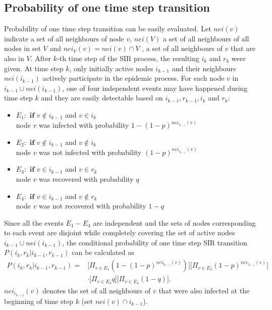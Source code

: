 \documentclass[times, utf8, diplomski]{fer}
\newcommand\tab[1][1cm]{\hspace*{#1}}
\begin{document}
\subsection{Probability of one time step transition}
Probability of one time step transition can be easily evaluated. Let $nei(v)$ indicate a set of all neighbours of node $v$,  $nei(V)$ a set of all neighbours of all nodes in set $V$ and  $nei_V(v) = nei(v) \cap V$ ,  a set of all neighbours of $v$ that are also in $V$. After $k$-th time step of the SIR process, the resulting $i_k$ and $r_k$ were given. At time step $k$, only initially active nodes $i_{k - 1}$ and their neighbours $nei(i_{k - 1})$ actively participate in the epidemic process. For each node $v$ in $i_{k - 1} \cup nei(i_{k - 1})$, one of four independent events may have happened during time step $k$ and they are easily detectable based on $i_{k - 1}, r_{k - 1}, i_{k}$ and $r_{k}$:
\let\labelitemi\labelitemii
\begin{itemize}
\item{$E_1:$ $\mathbf{if}$ $v \not\in i_{k - 1}$ and $v \in i_{k}$\\ \tab node $v$ was infected with probability $1 - (1 - p) ^ {nei_{i_{k-1}}(v)}$}
\item{$E_2:$ $\mathbf{if}$ $v \not\in i_{k - 1}$ and $v \not \in i_{k}$\\ \tab node $v$ was not infected with probability $(1 - p)^{nei_{i_{k-1}}(v)}$}
\item{$E_3:$ $\mathbf{if}$ $v \in i_{k - 1}$ and $v \in r_{k}$\\ \tab  node $v$ was recovered with probability $q$}
\item{$E_4:$ $\mathbf{if}$ $v \in i_{k - 1}$ and $v \not\in r_{k}$ \\ \tab node $v$ was not recovered with probability $1 - q$}
\end{itemize}

Since all the events $E_1 - E_4$ are independent and the sets of nodes corresponding to each event are disjoint while completely covering the set of active nodes $i_{k - 1} \cup nei(i_{k - 1})$, the  conditional probability of  one time step SIR transition $P(i_k, r_k | i_{k - 1}, r_{k - 1})$ can be calculated as
\begin{equation}
\begin{split}
P(i_k, r_k | i_{k - 1}, r_{k - 1}) =  &\big[\Pi_{v \in E_1} (1 - (1 - p) ^ {nei_{i_{k-1}}(v)})\big]\big[\Pi_{v \in E_2} (1 - p)^{nei_{i_{k-1}}(v)} \big] \\& \cdot
\big[\Pi_{v \in E_3} q\big]\big[ \Pi_{v \in E_4} (1 - q)\big].
\end{split}
\label{fISS}
\end{equation}
 $nei_{i_{k-1}}(v)$ denotes the set of all neighbours of $v$ that were also infected  at the beginning of time step $k$ (set $nei(v) \cap i_{k - 1}$). 
\end{document}
